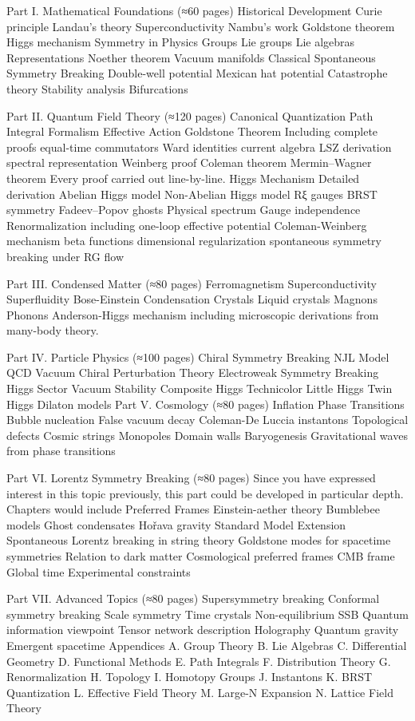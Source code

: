 Part I. Mathematical Foundations (≈60 pages)
Historical Development
Curie principle
Landau's theory
Superconductivity
Nambu's work
Goldstone theorem
Higgs mechanism
Symmetry in Physics
Groups
Lie groups
Lie algebras
Representations
Noether theorem
Vacuum manifolds
Classical Spontaneous Symmetry Breaking
Double-well potential
Mexican hat potential
Catastrophe theory
Stability analysis
Bifurcations

Part II. Quantum Field Theory (≈120 pages)
Canonical Quantization
Path Integral Formalism
Effective Action
Goldstone Theorem
Including complete proofs
equal-time commutators
Ward identities
current algebra
LSZ derivation
spectral representation
Weinberg proof
Coleman theorem
Mermin–Wagner theorem
Every proof carried out line-by-line.
Higgs Mechanism
Detailed derivation
Abelian Higgs model
Non-Abelian Higgs model
Rξ gauges
BRST symmetry
Fadeev–Popov ghosts
Physical spectrum
Gauge independence
Renormalization
including
one-loop effective potential
Coleman-Weinberg mechanism
beta functions
dimensional regularization
spontaneous symmetry breaking under RG flow

Part III. Condensed Matter (≈80 pages)
Ferromagnetism
Superconductivity
Superfluidity
Bose-Einstein Condensation
Crystals
Liquid crystals
Magnons
Phonons
Anderson-Higgs mechanism
including microscopic derivations from many-body theory.

Part IV. Particle Physics (≈100 pages)
Chiral Symmetry Breaking
NJL Model
QCD Vacuum
Chiral Perturbation Theory
Electroweak Symmetry Breaking
Higgs Sector
Vacuum Stability
Composite Higgs
Technicolor
Little Higgs
Twin Higgs
Dilaton models
Part V. Cosmology (≈80 pages)
Inflation
Phase Transitions
Bubble nucleation
False vacuum decay
Coleman-De Luccia instantons
Topological defects
Cosmic strings
Monopoles
Domain walls
Baryogenesis
Gravitational waves from phase transitions

Part VI. Lorentz Symmetry Breaking (≈80 pages)
Since you have expressed interest in this topic previously, this part could be developed in particular depth.
Chapters would include
Preferred Frames
Einstein-aether theory
Bumblebee models
Ghost condensates
Hořava gravity
Standard Model Extension
Spontaneous Lorentz breaking in string theory
Goldstone modes for spacetime symmetries
Relation to dark matter
Cosmological preferred frames
CMB frame
Global time
Experimental constraints

Part VII. Advanced Topics (≈80 pages)
Supersymmetry breaking
Conformal symmetry breaking
Scale symmetry
Time crystals
Non-equilibrium SSB
Quantum information viewpoint
Tensor network description
Holography
Quantum gravity
Emergent spacetime
Appendices
A. Group Theory
B. Lie Algebras
C. Differential Geometry
D. Functional Methods
E. Path Integrals
F. Distribution Theory
G. Renormalization
H. Topology
I. Homotopy Groups
J. Instantons
K. BRST Quantization
L. Effective Field Theory
M. Large-N Expansion
N. Lattice Field Theory

